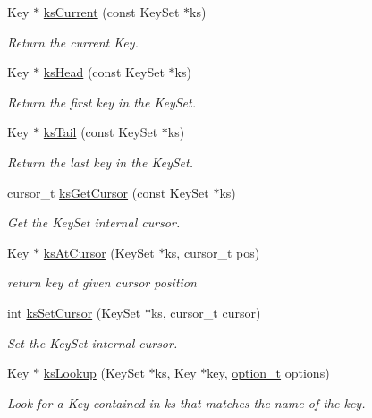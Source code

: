 \begin{DoxyCompactItemize}
Key $\ast$ \hyperlink{group__keyset_ga4287b9416912c5f2ab9c195cb74fb094}{ks\-Current} (const Key\-Set $\ast$ks)
\begin{DoxyCompactList}\small\item\em Return the current Key. \end{DoxyCompactList}\item 
Key $\ast$ \hyperlink{group__keyset_gae7dbf3aef70e67b5328475eb3d1f92f5}{ks\-Head} (const Key\-Set $\ast$ks)
\begin{DoxyCompactList}\small\item\em Return the first key in the Key\-Set. \end{DoxyCompactList}\item 
Key $\ast$ \hyperlink{group__keyset_gadca442c4ab43cf532b15091d7711559e}{ks\-Tail} (const Key\-Set $\ast$ks)
\begin{DoxyCompactList}\small\item\em Return the last key in the Key\-Set. \end{DoxyCompactList}\item 
cursor\-\_\-t \hyperlink{group__keyset_gaffe507ab9281c322eb16c3e992075d29}{ks\-Get\-Cursor} (const Key\-Set $\ast$ks)
\begin{DoxyCompactList}\small\item\em Get the Key\-Set internal cursor. \end{DoxyCompactList}\item 
Key $\ast$ \hyperlink{group__keyset_ga3604cc41505f7e19db945cece67190b6}{ks\-At\-Cursor} (Key\-Set $\ast$ks, cursor\-\_\-t pos)
\begin{DoxyCompactList}\small\item\em return key at given cursor position \end{DoxyCompactList}\item 
int \hyperlink{group__keyset_gad94c9ffaa3e8034564c0712fd407c345}{ks\-Set\-Cursor} (Key\-Set $\ast$ks, cursor\-\_\-t cursor)
\begin{DoxyCompactList}\small\item\em Set the Key\-Set internal cursor. \end{DoxyCompactList}\item 
Key $\ast$ \hyperlink{group__keyset_gaa34fc43a081e6b01e4120daa6c112004}{ks\-Lookup} (Key\-Set $\ast$ks, Key $\ast$key, \hyperlink{group__keyset_ga98a3d6a4016c9dad9cbd1a99a9c2a45a}{option\-\_\-t} options)
\begin{DoxyCompactList}\small\item\em Look for a Key contained in {\ttfamily ks} that matches the name of the {\ttfamily key}. \end{DoxyCompactList}\item 

\end{DoxyCompactItemize}
